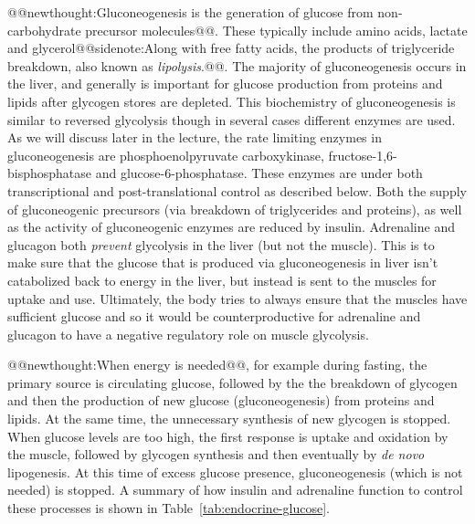 \documentclass{tufte-handout}
\makeatletter
\def\newthought#1{@@newthought:#1@@}
\def\sidenote#1{@@sidenote:#1@@}
\makeatother
\begin{document}
\newthought{Gluconeogenesis is the generation of glucose from non-carbohydrate precursor molecules}.  These typically include amino acids, lactate and glycerol\sidenote{Along with free fatty acids, the products of triglyceride breakdown, also known as \emph{lipolysis}.}.  The majority of gluconeogenesis occurs in the liver, and generally is important for glucose production from proteins and lipids after glycogen stores are depleted.  This biochemistry of gluconeogenesis is similar to reversed glycolysis though in several cases different enzymes are used.  As we will discuss later in the lecture, the rate limiting enzymes in gluconeogenesis are phosphoenolpyruvate carboxykinase, fructose-1,6-bisphosphatase and glucose-6-phosphatase.  These enzymes are under both transcriptional and post-translational control as described below.  Both the supply of gluconeogenic precursors (via breakdown of triglycerides and proteins), as well as the activity of gluconeogenic enzymes are reduced by insulin.  Adrenaline and glucagon both \emph{prevent} glycolysis in the liver (but not the muscle).  This is to make sure that the glucose that is produced via gluconeogenesis in liver isn't catabolized back to energy in the liver, but instead is sent to the muscles for uptake and use. Ultimately, the body tries to always ensure that the muscles have sufficient glucose and so it would be counterproductive for adrenaline and glucagon to have a negative regulatory role on muscle glycolysis.

\newthought{When energy is needed}, for example during fasting, the primary source is circulating glucose, followed by the the breakdown of glycogen and then the production of new glucose (gluconeogenesis) from proteins and lipids.  At the same time, the unnecessary synthesis of new glycogen is stopped.  When glucose levels are too high, the first response is uptake and oxidation by the muscle, followed by glycogen synthesis and then eventually by \textit{de novo} lipogenesis.  At this time of excess glucose presence, gluconeogenesis (which is not needed) is stopped.  A summary of how insulin and adrenaline function to control these processes is shown in Table~\ref{tab:endocrine-glucose}.
\end{document}
